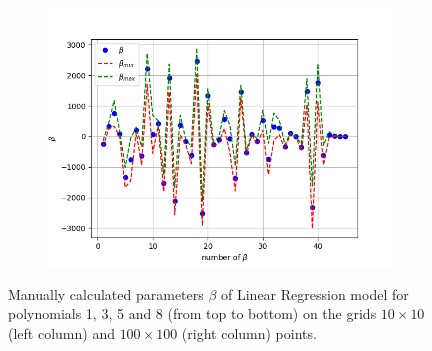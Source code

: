 \begin{figure}[!ht]
\begin{subfigure}{\textwidth}
\end{subfigure}
\begin{subfigure}{\textwidth}
  \centering
\includegraphics[width=0.5\linewidth]{images/betas/fake_linear_beta_p08_n100.png}
\end{subfigure}
\caption{Manually calculated parameters $\beta$ of Linear Regression model for polynomials 1, 3, 5 and 8 (from top to bottom) on the grids $10\times10$ (left column) and $100\times100$ (right column) points.}
\label{fig:linear-beta}
\end{figure}

